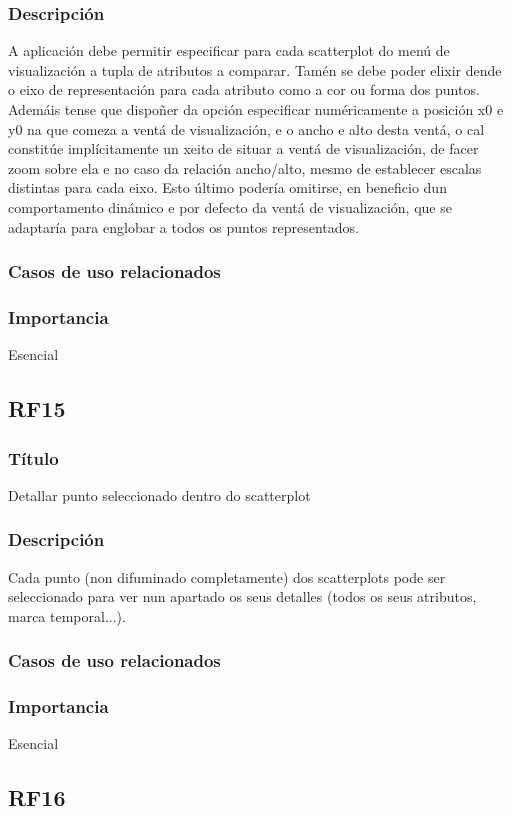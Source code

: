 \subsubsection{Descripción}
A aplicación debe permitir especificar para cada scatterplot do menú de visualización a tupla de atributos a comparar. Tamén se debe poder elixir dende o eixo de representación para cada atributo como a cor ou forma dos puntos. Ademáis tense que dispoñer da opción especificar numéricamente a posición x0 e y0 na que comeza a ventá de visualización, e o ancho e alto desta ventá, o cal constitúe implícitamente un xeito de situar a ventá de visualización, de facer zoom sobre ela e no caso da relación ancho/alto, mesmo de establecer escalas distintas para cada eixo. Esto último podería omitirse, en beneficio dun comportamento dinámico e por defecto da ventá de visualización, que se adaptaría para englobar a todos os puntos representados.
\subsubsection{Casos de uso relacionados}
\subsubsection{Importancia}
Esencial

\subsection{RF15}
\subsubsection{Título}
Detallar punto seleccionado dentro do scatterplot
\subsubsection{Descripción}
Cada punto (non difuminado completamente) dos scatterplots pode ser seleccionado para ver nun apartado os seus detalles (todos os seus atributos, marca temporal...).
\subsubsection{Casos de uso relacionados}
\subsubsection{Importancia}
Esencial

\subsection{RF16}
